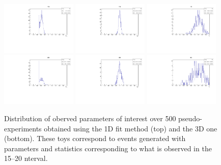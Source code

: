 \begin{figure}[h]
\centering
\includegraphics[width=0.32\textwidth]{Lmumu/figs/toys3D/B1/1D/toys3D_afbB.pdf}
\includegraphics[width=0.32\textwidth]{Lmumu/figs/toys3D/B1/1D/toys3D_afb.pdf}
\includegraphics[width=0.32\textwidth]{Lmumu/figs/toys3D/B1/1D/toys3D_fL.pdf} \\
\includegraphics[width=0.32\textwidth]{Lmumu/figs/toys3D/B1/3D/toys3D_afbB.pdf}
\includegraphics[width=0.32\textwidth]{Lmumu/figs/toys3D/B1/3D/toys3D_afb.pdf}
\includegraphics[width=0.32\textwidth]{Lmumu/figs/toys3D/B1/3D/toys3D_fL.pdf} \\
\caption{Distribution of oberved parameters of interest over 500 pseudo-experiments obtained
using the 1D fit method (top) and the 3D one (bottom). These toys correspond to events
generated with parameters and statistics corresponding to what is observed in the 15--20 \qsq nterval. }
\label{fig:3DtoyResults}
\end{figure}
